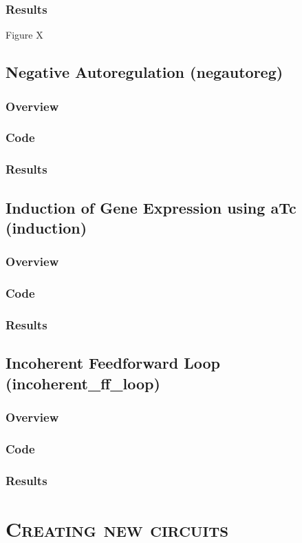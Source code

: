 \documentclass[english]{report}
\begin{document}
		\subsection{Results}
		{\color{red}Figure X}
	\section{Negative Autoregulation (negautoreg)}
		\subsection{Overview}
		\subsection{Code}
		\subsection{Results}	
	\section{Induction of Gene Expression using aTc (induction)}
		\subsection{Overview}
		\subsection{Code}
		\subsection{Results}	
	\section{Incoherent Feedforward Loop (incoherent\_ff\_loop)}
		\subsection{Overview}
		\subsection{Code}
		\subsection{Results}	

\chapter{\textsc{Creating new circuits}}
\end{document}
